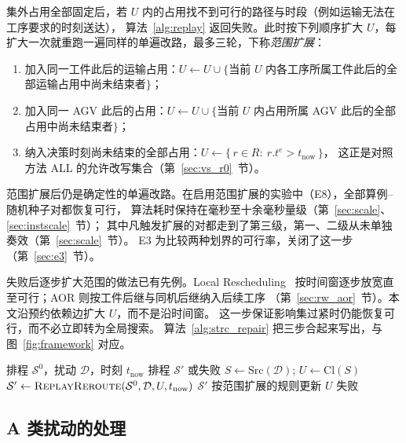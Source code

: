 \documentclass[manuscript,screen,review]{acmart}
\begin{document}
集外占用全部固定后，若 \(U\) 内的占用找不到可行的路径与时段（例如运输无法在工序要求的时刻送达），
算法~\ref{alg:replay} 返回失败。此时按下列顺序扩大 \(U\)，每扩大一次就重跑一遍同样的单遍改路，最多三轮，下称\emph{范围扩展}：
\begin{enumerate}[label=(\roman*),leftmargin=2em,itemsep=0.15em]
\item 加入同一工件此后的运输占用：\(U\leftarrow U\cup\{\)当前 \(U\) 内各工序所属工件此后的全部运输占用中尚未结束者\(\}\)；
\item 加入同一 AGV 此后的占用：\(U\leftarrow U\cup\{\)当前 \(U\) 内占用所属 AGV 此后的全部占用中尚未结束者\(\}\)；
\item 纳入决策时刻尚未结束的全部占用：\(U\leftarrow\{\,r\in R:\ r.t^e>t_{\mathrm{now}}\,\}\)，
这正是对照方法 ALL 的允许改写集合（第~\ref{sec:vs_r0}~节）。
\end{enumerate}
范围扩展后仍是确定性的单遍改路。在启用范围扩展的实验中（E8），全部算例--随机种子对都恢复可行，
算法耗时保持在毫秒至十余毫秒量级（第~\ref{sec:scale}、\ref{sec:instscale}~节）；
其中凡触发扩展的对都走到了第三级，第一、二级从未单独奏效（第~\ref{sec:scale}~节）。
E3 为比较两种划界的可行率，关闭了这一步（第~\ref{sec:e3}~节）。

失败后逐步扩大范围的做法已有先例。Local Rescheduling~\cite{kuster2007local}
按时间窗逐步放宽直至可行；AOR 则按工件后继与同机后继纳入后续工序
（第~\ref{sec:rw_aor}~节）。本文沿预约依赖边扩大 \(U\)，而不是沿时间窗。
这一步保证影响集过紧时仍能恢复可行，而不必立即转为全局搜索。
算法~\ref{alg:strc_repair} 把三步合起来写出，与图~\ref{fig:framework} 对应。

\begin{algorithm}[t]
\caption{基于预约影响集的有界修复（划界 + 单遍改路 + 范围扩展）}
\label{alg:strc_repair}
\begin{algorithmic}[1]
\Require 排程 \(\mathcal{S}^0\)，扰动 \(\mathcal{D}\)，时刻 \(t_{\mathrm{now}}\)
\Ensure 排程 \(\mathcal{S}'\) 或失败
\State \(S \gets \mathrm{Src}(\mathcal{D})\);
      \(U \gets \mathrm{Cl}(S)\)
  \State \(\mathcal{S}' \gets \textsc{ReplayReroute}(\mathcal{S}^0,\mathcal{D},U,t_{\mathrm{now}})\)
    \State \Return \(\mathcal{S}'\)
  \EndIf
  \State 按范围扩展的规则更新 \(U\) 
\EndFor
\State \Return 失败
\end{algorithmic}
\end{algorithm}

\subsection{A 类扰动的处理}
\label{sec:afault}
\end{document}
